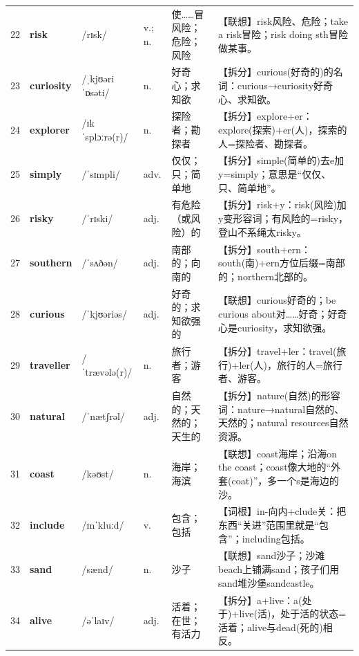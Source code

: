 \documentclass[UTF8,a4paper,11pt,oneside]{ctexbook}
\newcommand{\cellword}[1]{{\bfseries\textcolor{wordcol}{#1}}}
\newcommand{\cellipa}[1]{{\footnotesize\textcolor{ipacol}{#1}}}
\newcommand{\cellpos}[1]{\textcolor{poscol}{#1}}
\newcommand{\cellno}[1]{\textcolor{volcolor!75!black}{#1}}
\begin{document}
{\begin{longtable}{@{}C{0.045\textwidth}L{0.155\textwidth}L{0.175\textwidth}C{0.070\textwidth}L{0.180\textwidth}L{0.282\textwidth}@{}}
\cellno{22} & \cellword{risk} & \cellipa{/rɪsk/} & \cellpos{v.;\allowbreak{} n.} & 使……冒风险；危险；风险 & \textcolor{tagAssoc}{【联想】}risk风险、危险；take a risk冒险；risk doing sth冒险做某事。 \\
 \cellno{23} & \cellword{curiosity} & \cellipa{/ˌkjʊəriˈɒsəti/} & \cellpos{n.} & 好奇心；求知欲 & \textcolor{tagSplit}{【拆分】}curious(好奇的)的名词：curious→\allowbreak{}curiosity好奇心、求知欲。 \\
\cellno{24} & \cellword{explorer} & \cellipa{/ɪkˈsplɔːrə(r)/} & \cellpos{n.} & 探险者；勘探者 & \textcolor{tagSplit}{【拆分】}explore+er：explore(探索)+er(人)，探索的人=探险者、勘探者。 \\
 \cellno{25} & \cellword{simply} & \cellipa{/ˈsɪmpli/} & \cellpos{adv.} & 仅仅；只；简单地 & \textcolor{tagSplit}{【拆分】}simple(简单的)去e加y=simply；意思是“仅仅、只、简单地”。 \\
\cellno{26} & \cellword{risky} & \cellipa{/ˈrɪski/} & \cellpos{adj.} & 有危险（或风险）的 & \textcolor{tagSplit}{【拆分】}risk+y：risk(风险)加y变形容词；有风险的=risky，登山不系绳太risky。 \\
 \cellno{27} & \cellword{southern} & \cellipa{/ˈsʌðən/} & \cellpos{adj.} & 南部的；向南的 & \textcolor{tagSplit}{【拆分】}south+ern：south(南)+ern方位后缀=南部的；northern北部的。 \\
\cellno{28} & \cellword{curious} & \cellipa{/ˈkjʊəriəs/} & \cellpos{adj.} & 好奇的；求知欲强的 & \textcolor{tagAssoc}{【联想】}curious好奇的；be curious about对……好奇；好奇心是curiosity，求知欲强。 \\
 \cellno{29} & \cellword{traveller} & \cellipa{/ˈtrævələ(r)/} & \cellpos{n.} & 旅行者；游客 & \textcolor{tagSplit}{【拆分】}travel+ler：travel(旅行)+ler(人)，旅行的人=旅行者、游客。 \\
\cellno{30} & \cellword{natural} & \cellipa{/ˈnætʃrəl/} & \cellpos{adj.} & 自然的；天然的；天生的 & \textcolor{tagSplit}{【拆分】}nature(自然)的形容词：nature→\allowbreak{}natural自然的、天然的；natural resources自然资源。 \\
 \cellno{31} & \cellword{coast} & \cellipa{/kəʊst/} & \cellpos{n.} & 海岸；海滨 & \textcolor{tagAssoc}{【联想】}coast海岸；沿海on the coast；coast像大地的“外套(coat)”，多一个s是海边的沙。 \\
\cellno{32} & \cellword{include} & \cellipa{/ɪnˈkluːd/} & \cellpos{v.} & 包含；包括 & \textcolor{tagRoot}{【词根】}in-向内+clude关：把东西“关进”范围里就是“包含”；including包括。 \\
 \cellno{33} & \cellword{sand} & \cellipa{/sænd/} & \cellpos{n.} & 沙子 & \textcolor{tagAssoc}{【联想】}sand沙子；沙滩beach上铺满sand；孩子们用sand堆沙堡sandcastle。 \\
\cellno{34} & \cellword{alive} & \cellipa{/əˈlaɪv/} & \cellpos{adj.} & 活着；在世；有活力 & \textcolor{tagSplit}{【拆分】}a+live：a(处于)+live(活)，处于活的状态=活着；alive与dead(死的)相反。 \\
\end{longtable}
}
\end{document}
